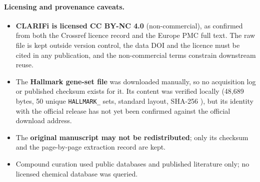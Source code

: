 \paragraph{Licensing and provenance caveats.}
\begin{itemize}
  \item \textbf{CLARIFi is licensed CC BY-NC 4.0} (non-commercial), as confirmed from both
    the Crossref licence record and the Europe PMC full text. The raw file is kept outside
    version control, the data DOI and the licence must be cited in any publication, and the
    non-commercial terms constrain downstream reuse.
  \item The \textbf{Hallmark gene-set file} was downloaded manually, so no acquisition log
    or published checksum exists for it. Its content was verified locally (48,689 bytes,
    50 unique \texttt{HALLMARK\_} sets, standard layout, SHA-256 ),
    but its identity with the official release has not yet been confirmed against the
    official download address.
  \item The \textbf{original manuscript may not be redistributed}; only its checksum and
    the page-by-page extraction record are kept.
  \item Compound curation used public databases and published literature only; no licensed
    chemical database was queried.
\end{itemize}
